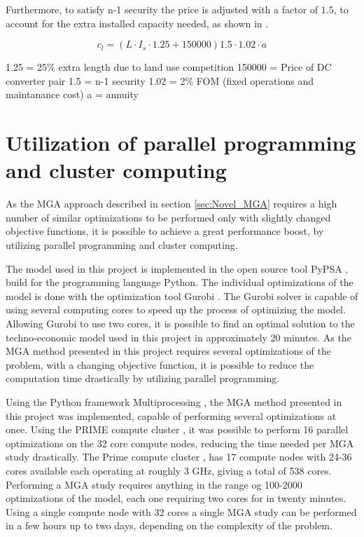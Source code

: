 Furthermore, to satisfy n-1 security the price is adjusted with a factor of $1.5$, to account for the extra installed capacity needed, as shown in \cite{PyPSA_euro_30_model}. 

\begin{equation}
c_l = \left( L\cdot I_s \cdot 1.25+150000 \right) 1.5 \cdot 1.02 \cdot a
\end{equation}

1.25 = 25\% extra length due to land use competition
150000 = Price of DC converter pair
1.5 = n-1 security 
1.02 = 2\% FOM (fixed operations and maintanance cost)
a = annuity 



\section{Utilization of parallel programming and cluster computing}
As the MGA approach described in section \ref{sec:Novel_MGA} requires a high number of similar optimizations to be performed only with slightly changed objective functions, it is possible to achieve a great performance boost, by utilizing parallel programming and cluster computing.

The model used in this project is implemented in the open source tool PyPSA \cite{Pypsa}, build for the programming language Python. The individual optimizations of the model is done with the optimization tool Gurobi \cite{Gurobi}. The Gurobi solver is capable of using several computing cores to speed up the process of optimizing the model. Allowing Gurobi to use two cores, it is possible to find an optimal solution to the techno-economic model used in this project in approximately 20 minutes. As the MGA method presented in this project requires several optimizations of the problem, with a changing objective function, it is possible to reduce the computation time drastically by utilizing parallel programming. 

Using the Python framework Multiprocessing \cite{Multiprocessing}, the MGA method presented in this project was implemented, capable of performing several optimizations at once. Using the PRIME compute cluster \cite{Prime}, it was possible to perform 16 parallel optimizations on the 32 core compute nodes, reducing the time needed per MGA study drastically. 
The Prime compute cluster \cite{Prime}, has 17 compute nodes with 24-36 cores available each operating at roughly 3 GHz, giving a total of 538 cores. Performing a MGA study requires anything in the range og 100-2000 optimizations of the model, each one requiring two cores for in twenty minutes. Using a single compute node with 32 cores a single MGA study can be performed in a few hours up to two days, depending on the complexity of the problem. 

